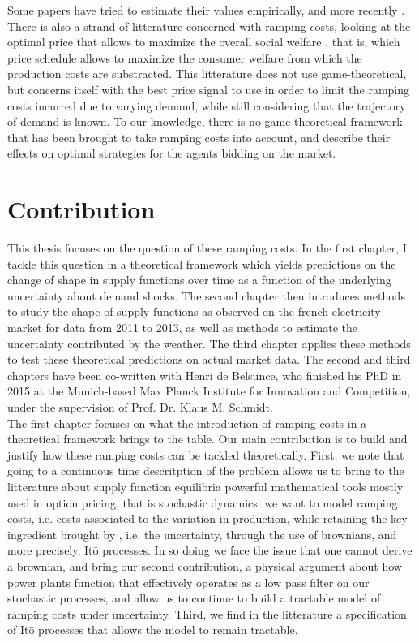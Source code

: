 Some papers have tried to estimate their values empirically, \cite{wolak2007quantifying} and more recently \cite{reguant2011welfare}. There is also a strand of litterature concerned with ramping costs, looking at the optimal price that allows to maximize the overall social welfare \cite{tanaka2006real}, that is, which price schedule allows to maximize the consumer welfare from which the production costs are substracted. This litterature does not use game-theoretical, but concerns itself with the best price signal to use in order to limit the ramping costs incurred due to varying demand, while still considering that the trajectory of demand is known. To our knowledge, there is no game-theoretical framework that has been brought to take ramping costs into account, and describe their effects on optimal strategies for the agents bidding on the market. 

\section*{Contribution}

This thesis focuses on the question of these ramping costs. In the first chapter, I tackle this question in a theoretical framework which yields predictions on the change of shape in supply functions over time as a function of the underlying uncertainty about demand shocks. The second chapter then introduces methods to study the shape of supply functions as observed on the french electricity market for data from 2011 to 2013, as well as methods to estimate the uncertainty contributed by the weather. The third chapter applies these methods to test these theoretical predictions on actual market data. The second and third chapters have been co-written with Henri de Belsunce, who finished his PhD in 2015 at the Munich-based Max Planck Institute for Innovation and Competition, under the supervision of Prof. Dr. Klaus M. Schmidt.\\

The first chapter focuses on what the introduction of ramping costs in a theoretical framework brings to the table. Our main contribution is to build and justify how these ramping costs can be tackled theoretically. First, we note that going to a continuous time descritption of the problem allows us to bring to the litterature about supply function equilibria powerful mathematical tools mostly used in option pricing, that is stochastic dynamics: we want to model ramping costs, i.e. costs associated to the variation in production, while retaining the key ingredient brought by \cite{KM}, i.e. the uncertainty, through the use of brownians, and more precisely, It\={o} processes. In so doing we face the issue that one cannot derive a brownian, and bring our second contribution, a physical argument about how power plants function that effectively operates as a low pass filter on our stochastic processes, and allow us to continue to build a tractable model of ramping costs under uncertainty. Third, we find in the litterature a specification of It\={o} processes that allows the model to remain tractable. \\

